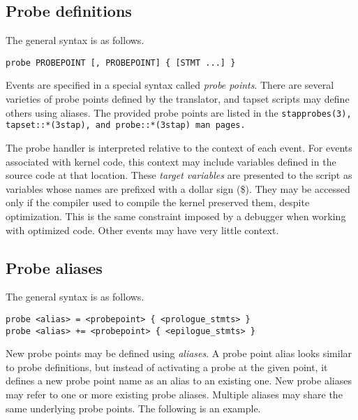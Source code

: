 \documentclass[twoside,english]{article}
\newenvironment{vindent}
{\begin{list}{}{\setlength{\listparindent}{6pt}}
\item[]}
{\end{list}}
\begin{document}
\subsection{Probe definitions}

The general syntax is as follows.

\begin{vindent}
\begin{verbatim}
probe PROBEPOINT [, PROBEPOINT] { [STMT ...] }
\end{verbatim}
\end{vindent}
Events are specified in a special syntax called \emph{probe points}. There
are several varieties of probe points defined by the translator, and tapset
scripts may define others using aliases. The provided probe points are listed
in the \tt{stapprobes(3)}, \tt{tapset::*(3stap)}, and \tt{probe::*(3stap)} man pages.

The probe handler is interpreted relative to the context of each event. For
events associated with kernel code, this context may include variables defined
in the source code at that location. These \emph{target variables}
are presented to the script as variables whose names are prefixed with a
dollar sign (\$). They may be accessed only if the compiler used to compile
the kernel preserved them, despite optimization. This is the same constraint
imposed by a debugger when working with optimized code. Other events may
have very little context.


\subsection{Probe aliases\label{sub:Probe-aliases}}
The general syntax is as follows.

\begin{vindent}
\begin{verbatim}
probe <alias> = <probepoint> { <prologue_stmts> }
probe <alias> += <probepoint> { <epilogue_stmts> }
\end{verbatim}
\end{vindent}

New probe points may be defined using \emph{aliases}. A probe point alias
looks similar to probe definitions, but instead of activating a probe at
the given point, it defines a new probe point name as an alias to an existing
one. New probe aliases may refer to one or more existing probe aliases.
Multiple aliases may share the same underlying probe points.
The following is an example.
\end{document}
